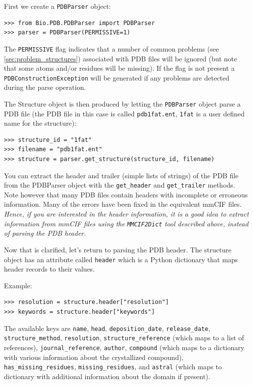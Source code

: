 First we create a \texttt{PDBParser} object:

\begin{verbatim}
>>> from Bio.PDB.PDBParser import PDBParser
>>> parser = PDBParser(PERMISSIVE=1)
\end{verbatim}

The \texttt{PERMISSIVE} flag indicates that a number of common problems (see \ref{sec:problem_structures}) associated with PDB files will be ignored (but note that some atoms and/or residues will be missing). If the flag is not present a \texttt{PDBConstructionException} will be generated if any problems are detected during the parse operation.

The Structure object is then produced by letting the \texttt{PDBParser} object parse a PDB file (the PDB file in this case is called \verb|pdb1fat.ent|, \verb|1fat| is a user defined name for the structure):

\begin{verbatim}
>>> structure_id = "1fat"
>>> filename = "pdb1fat.ent"
>>> structure = parser.get_structure(structure_id, filename)
\end{verbatim}

You can extract the header and trailer (simple lists of strings) of the PDB
file from the PDBParser object with the \texttt{get\_header} and \texttt{get\_trailer}
methods.  Note however that many PDB files contain headers with
incomplete or erroneous information. Many of the errors have been
fixed in the equivalent mmCIF files. \emph{Hence, if you are interested
in the header information, it is a good idea to extract information
from mmCIF files using the} \texttt{\emph{MMCIF2Dict}} \emph{tool
described above, instead of parsing the PDB header. }

Now that is clarified, let's return to parsing the PDB header. The
structure object has an attribute called \texttt{header} which is
a Python dictionary that maps header records to their values.

Example:

\begin{verbatim}
>>> resolution = structure.header["resolution"]
>>> keywords = structure.header["keywords"]
\end{verbatim}
The available keys are \verb+name+, \verb+head+, \verb+deposition_date+,
\verb+release_date+, \verb+structure_method+, \verb+resolution+,
\verb+structure_reference+ (which maps to a list of references),
\verb+journal_reference+, \verb+author+, \verb+compound+ (which maps to
a dictionary with various information about the crystallized compound),
\verb+has_missing_residues+, \verb+missing_residues+, and \verb+astral+
(which maps to dictionary with additional information about the domain if present).

